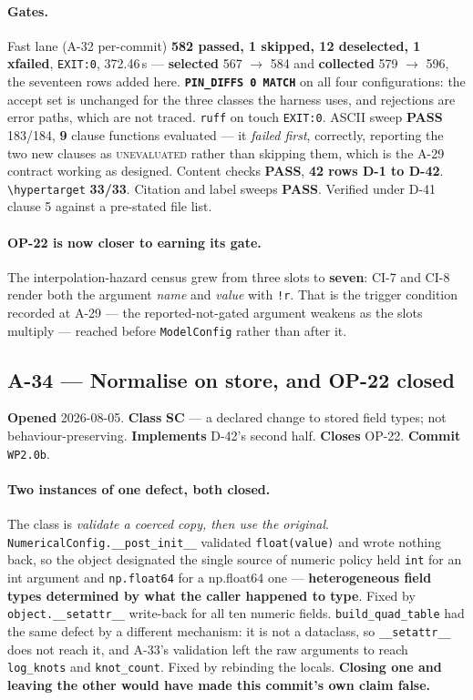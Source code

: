 \documentclass[
  10pt,
]{article}
\begin{document}
\paragraph{Gates.}
Fast lane (A-32 per-commit) \textbf{582 passed, 1 skipped, 12 deselected, 1 xfailed}, \texttt{EXIT:0}, 372.46\,s --- \textbf{selected} 567 $\rightarrow$ 584 and \textbf{collected} 579 $\rightarrow$ 596, the seventeen rows added here. \textbf{\texttt{PIN\_DIFFS 0 MATCH}} on all four configurations: the accept set is unchanged for the three classes the harness uses, and rejections are error paths, which are not traced. \texttt{ruff} on touch \texttt{EXIT:0}. ASCII sweep \textbf{PASS} 183/184, \textbf{9} clause functions evaluated --- it \emph{failed first}, correctly, reporting the two new clauses as \textsc{unevaluated} rather than skipping them, which is the A-29 contract working as designed. Content checks \textbf{PASS}, \textbf{42 rows D-1 to D-42}. \texttt{\textbackslash hypertarget} \textbf{33/33}. Citation and label sweeps \textbf{PASS}. Verified under D-41 clause 5 against a pre-stated file list.

\paragraph{OP-22 is now closer to earning its gate.}
The interpolation-hazard census grew from three slots to \textbf{seven}: CI-7 and CI-8 render both the argument \emph{name} and \emph{value} with \texttt{!r}. That is the trigger condition recorded at A-29 --- the reported-not-gated argument weakens as the slots multiply --- reached before \texttt{ModelConfig} rather than after it.

\hypertarget{a-34}{%
\subsection{A-34 --- Normalise on store, and OP-22 closed}\label{a-34}}

\textbf{Opened} 2026-08-05. \textbf{Class} \textbf{SC} --- a declared change to stored field types; not behaviour-preserving. \textbf{Implements} D-42's second half. \textbf{Closes} OP-22. \textbf{Commit} \texttt{WP2.0b}.

\paragraph{Two instances of one defect, both closed.}
The class is \emph{validate a coerced copy, then use the original}. \texttt{NumericalConfig.\_\_post\_init\_\_} validated \texttt{float(value)} and wrote nothing back, so the object designated the single source of numeric policy held \texttt{int} for an int argument and \texttt{np.float64} for a np.float64 one --- \textbf{heterogeneous field types determined by what the caller happened to type}. Fixed by \texttt{object.\_\_setattr\_\_} write-back for all ten numeric fields. \texttt{build\_quad\_table} had the same defect by a different mechanism: it is not a dataclass, so \texttt{\_\_setattr\_\_} does not reach it, and A-33's validation left the raw arguments to reach \texttt{log\_knots} and \texttt{knot\_count}. Fixed by rebinding the locals. \textbf{Closing one and leaving the other would have made this commit's own claim false.}
\end{document}
